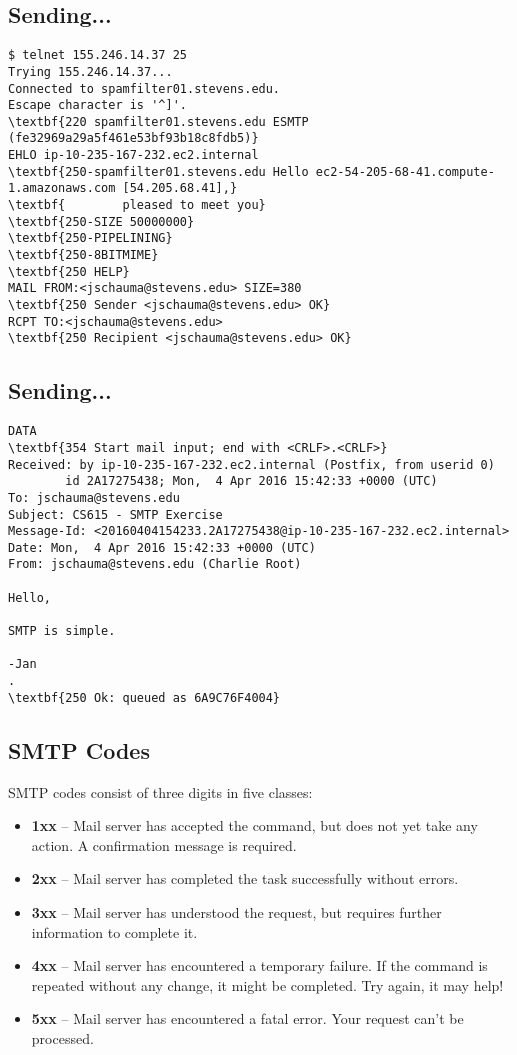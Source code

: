 \documentclass[xga]{xdvislides}
\begin{document}
\subsection{Sending...}
\begin{Verbatim}
$ telnet 155.246.14.37 25
Trying 155.246.14.37...
Connected to spamfilter01.stevens.edu.
Escape character is '^]'.
\textbf{220 spamfilter01.stevens.edu ESMTP (fe32969a29a5f461e53bf93b18c8fdb5)}
EHLO ip-10-235-167-232.ec2.internal
\textbf{250-spamfilter01.stevens.edu Hello ec2-54-205-68-41.compute-1.amazonaws.com [54.205.68.41],}
\textbf{        pleased to meet you}
\textbf{250-SIZE 50000000}
\textbf{250-PIPELINING}
\textbf{250-8BITMIME}
\textbf{250 HELP}
MAIL FROM:<jschauma@stevens.edu> SIZE=380
\textbf{250 Sender <jschauma@stevens.edu> OK}
RCPT TO:<jschauma@stevens.edu>
\textbf{250 Recipient <jschauma@stevens.edu> OK}
\end{Verbatim}

\subsection{Sending...}
\begin{Verbatim}
DATA
\textbf{354 Start mail input; end with <CRLF>.<CRLF>}
Received: by ip-10-235-167-232.ec2.internal (Postfix, from userid 0)
        id 2A17275438; Mon,  4 Apr 2016 15:42:33 +0000 (UTC)
To: jschauma@stevens.edu
Subject: CS615 - SMTP Exercise
Message-Id: <20160404154233.2A17275438@ip-10-235-167-232.ec2.internal>
Date: Mon,  4 Apr 2016 15:42:33 +0000 (UTC)
From: jschauma@stevens.edu (Charlie Root)

Hello,

SMTP is simple.

-Jan
.
\textbf{250 Ok: queued as 6A9C76F4004}
\end{Verbatim}

\subsection{SMTP Codes}
SMTP codes consist of three digits in five classes:
\begin{itemize}
	\item {\bf 1xx} --  Mail server has accepted the command, but does not yet
		take any action. A confirmation message is required.
	\item {\bf 2xx} --  Mail server has completed the task successfully
		without errors.
	\item {\bf 3xx} --  Mail server has understood the request, but requires
		further information to complete it.
	\item {\bf 4xx} --  Mail server has encountered a temporary failure. If
		the command is repeated without any change, it might be
		completed. Try again, it may help!
	\item {\bf 5xx} --  Mail server has encountered a fatal error. Your
		request can't be processed.
\end{itemize}
\end{document}
